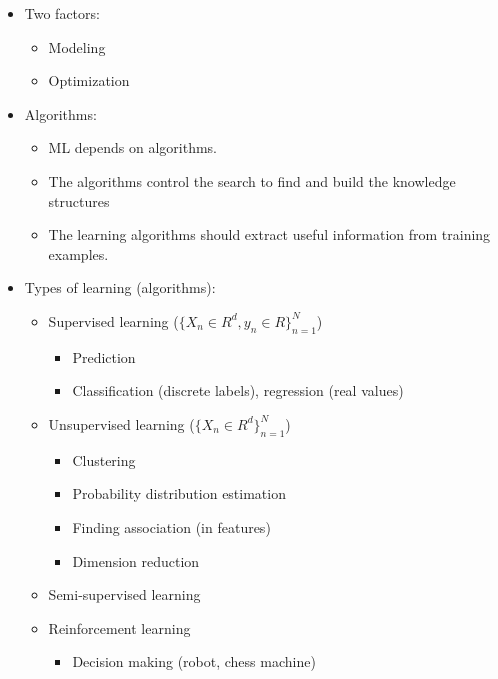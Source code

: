 \documentclass[
]{book}
\providecommand{\tightlist}{%
  \setlength{\itemsep}{0pt}\setlength{\parskip}{0pt}}
\begin{document}
\begin{itemize}
  \begin{itemize}
  \tightlist
  \item
    Types of training provided
  \item
    The form and extend of prior knowledge
  \item
    Type of feedback provided
  \item
    The learning algorithms used
  \end{itemize}
\item
  Two factors:

  \begin{itemize}
  \tightlist
  \item
    Modeling
  \item
    Optimization
  \end{itemize}
\item
  Algorithms:

  \begin{itemize}
  \tightlist
  \item
    ML depends on algorithms.
  \item
    The algorithms control the search to find and build the knowledge structures
  \item
    The learning algorithms should extract useful information from training examples.
  \end{itemize}
\item
  Types of learning (algorithms):

  \begin{itemize}
  \item
    Supervised learning (\(\{ X_n \in R^d, y_n \in R\}^N_{n=1}\))

    \begin{itemize}
    \tightlist
    \item
      Prediction
    \item
      Classification (discrete labels), regression (real values)
    \end{itemize}
  \item
    Unsupervised learning (\(\{ X_n \in R^d\}^N_{n=1}\))

    \begin{itemize}
    \tightlist
    \item
      Clustering
    \item
      Probability distribution estimation
    \item
      Finding association (in features)
    \item
      Dimension reduction
    \end{itemize}
  \item
    Semi-supervised learning
  \item
    Reinforcement learning

    \begin{itemize}
    \tightlist
    \item
      Decision making (robot, chess machine)
    \end{itemize}
  \end{itemize}
\end{itemize}
\end{document}
